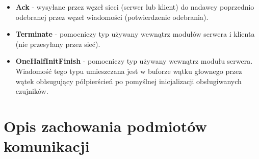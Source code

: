 \documentclass[a4paper,11pt]{article}
\begin{document}
\begin{itemize}
\item \textbf{Ack} - wysyłane przez węzeł sieci (serwer lub klient) do nadawcy poprzednio odebranej przez węzeł wiadomości (potwierdzenie odebrania).
\item \textbf{Terminate} - pomocniczy typ używany wewnątrz modułów serwera i klienta (nie przesyłany przez sieć).
\item \textbf{OneHalfInitFinish} - pomocniczy typ używany wewnątrz modułu serwera. Wiadomość tego typu umieszczana jest w buforze wątku głownego przez wątek obłsugujący półpierścień po pomyślnej inicjalizacji obsługiwanych czujników.
\end{itemize}

\section{Opis zachowania podmiotów komunikacji}
\end{document}
